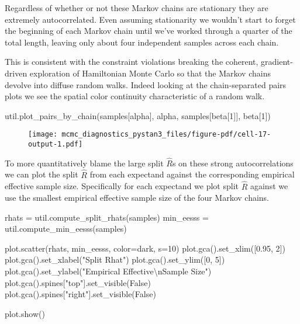 \documentclass[
  letterpaper,
  DIV=11,
  numbers=noendperiod]{scrartcl}
\newenvironment{Shaded}{\begin{snugshade}}{\end{snugshade}}
\newcommand{\CharTok}[1]{\textcolor[rgb]{0.13,0.47,0.30}{#1}}
\newcommand{\DecValTok}[1]{\textcolor[rgb]{0.68,0.00,0.00}{#1}}
\newcommand{\FloatTok}[1]{\textcolor[rgb]{0.68,0.00,0.00}{#1}}
\newcommand{\NormalTok}[1]{\textcolor[rgb]{0.00,0.23,0.31}{#1}}
\newcommand{\OperatorTok}[1]{\textcolor[rgb]{0.37,0.37,0.37}{#1}}
\newcommand{\StringTok}[1]{\textcolor[rgb]{0.13,0.47,0.30}{#1}}
\newcommand{\VariableTok}[1]{\textcolor[rgb]{0.07,0.07,0.07}{#1}}
\begin{document}
Regardless of whether or not these Markov chains are stationary they are
extremely autocorrelated. Even assuming stationarity we wouldn't start
to forget the beginning of each Markov chain until we've worked through
a quarter of the total length, leaving only about four independent
samples across each chain.

This is consistent with the constraint violations breaking the coherent,
gradient-driven exploration of Hamiltonian Monte Carlo so that the
Markov chains devolve into diffuse random walks. Indeed looking at the
chain-separated pairs plots we see the spatial color continuity
characteristic of a random walk.

\begin{Shaded}
\begin{Highlighting}[]
\NormalTok{util.plot\_pairs\_by\_chain(samples[}\StringTok{\textquotesingle{}alpha\textquotesingle{}}\NormalTok{], }\StringTok{\textquotesingle{}alpha\textquotesingle{}}\NormalTok{, }
\NormalTok{                         samples[}\StringTok{\textquotesingle{}beta[1]\textquotesingle{}}\NormalTok{], }\StringTok{\textquotesingle{}beta[1]\textquotesingle{}}\NormalTok{)}
\end{Highlighting}
\end{Shaded}

\begin{figure}[H]

{\centering \texttt{[image: mcmc\_diagnostics\_pystan3\_files/figure-pdf/cell-17-output-1.pdf]}

}

\end{figure}

To more quantitatively blame the large split \(\hat{R}\)s on these
strong autocorrelations we can plot the split \(\hat{R}\) from each
expectand against the corresponding empirical effective sample size.
Specifically for each expectand we plot split \(\hat{R}\) against we use
the smallest empirical effective sample size of the four Markov chains.

\begin{Shaded}
\begin{Highlighting}[]
\NormalTok{rhats }\OperatorTok{=}\NormalTok{ util.compute\_split\_rhats(samples)}
\NormalTok{min\_eesss }\OperatorTok{=}\NormalTok{ util.compute\_min\_eesss(samples)}

\NormalTok{plot.scatter(rhats, min\_eesss, color}\OperatorTok{=}\NormalTok{dark, s}\OperatorTok{=}\DecValTok{10}\NormalTok{)}
\NormalTok{plot.gca().set\_xlim([}\FloatTok{0.95}\NormalTok{, }\DecValTok{2}\NormalTok{])}
\NormalTok{plot.gca().set\_xlabel(}\StringTok{"Split Rhat"}\NormalTok{)}
\NormalTok{plot.gca().set\_ylim([}\DecValTok{0}\NormalTok{, }\DecValTok{5}\NormalTok{])}
\NormalTok{plot.gca().set\_ylabel(}\StringTok{"Empirical Effective}\CharTok{\textbackslash{}n}\StringTok{Sample Size"}\NormalTok{)}
\NormalTok{plot.gca().spines[}\StringTok{"top"}\NormalTok{].set\_visible(}\VariableTok{False}\NormalTok{)}
\NormalTok{plot.gca().spines[}\StringTok{"right"}\NormalTok{].set\_visible(}\VariableTok{False}\NormalTok{)}

\NormalTok{plot.show()}
\end{Highlighting}
\end{Shaded}
\end{document}

